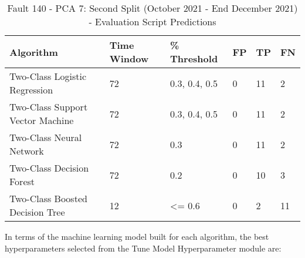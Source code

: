 \begin{table}[!ht]
    \centering
    \begin{tabular}{|l|l|l|l|l|l|}
    \hline
        Algorithm & Time Window & \% Threshold & FP & TP & FN \\ \hline
        Two-Class Logistic Regression & 72 & 0.3, 0.4, 0.5 & 0 & 11 & 2 \\ \hline
        Two-Class Support Vector Machine & 72 & 0.3, 0.4, 0.5 & 0 & 11 & 2 \\ \hline
        Two-Class Neural Network & 72 & 0.3 & 0 & 11 & 2 \\ \hline
        Two-Class Decision Forest & 72 & 0.2 & 0 & 10 & 3 \\ \hline
        Two-Class Boosted Decision Tree & 12 & <= 0.6 & 0 & 2 & 11 \\ \hline
    \end{tabular}
    \caption{Fault 140 - PCA 7: Second Split (October 2021 - End December 2021) - Evaluation Script Predictions}
    \label{9112_SCA34_1st}
\end{table}

In terms of the machine learning model built for each algorithm, the best hyperparameters selected from the Tune Model Hyperparameter module are:

